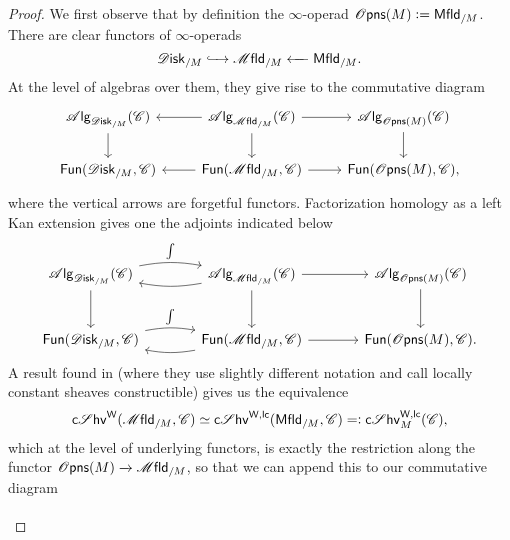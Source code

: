 \documentclass[../text]{subfiles}
\begin{document}
\begin{proof}
    We first observe that by definition the $\infty$-operad $\opens(M) := \mfld[r]_{/M}$. There are clear functors of $\infty$-operads
    \begin{equation}
        \disk_{/M} \xhookrightarrow{\ \ \ } \mfld_{/M} \xleftarrow{\ \ \ } \mfld[r]_{/M}.
    \end{equation}
    At the level of algebras over them, they give rise to the commutative diagram
    \begin{equation}
        \begin{tikzcd}
            \alg{\disk_{/M}} (\catC) \arrow[d] & \alg{\mfld_{/M}} (\catC) \arrow[l] \arrow[r] \arrow[d] & \alg{\opens(M)} (\catC) \arrow[d] \\
            \mathsf{Fun}(\disk_{/M}, \catC) & \mathsf{Fun}(\mfld_{/M}, \catC) \arrow[l] \arrow[r] & \mathsf{Fun}(\opens(M), \catC),
        \end{tikzcd}
    \end{equation}
    where the vertical arrows are forgetful functors. Factorization homology as a left Kan extension gives one the adjoints indicated below
    \begin{equation}
        \begin{tikzcd}[row sep = large, column sep = large]
            \alg{\disk_{/M}} (\catC) \arrow[r, bend left=10, "\int"] \arrow[d] & \alg{\mfld_{/M}} (\catC) \arrow[l, bend left=10] \arrow[r] \arrow[d] & \alg{\opens(M)} (\catC) \arrow[d] \\
            \mathsf{Fun}(\disk_{/M}, \catC) \arrow[r, bend left=10, "\int"] & \mathsf{Fun}(\mfld_{/M}, \catC) \arrow[l, bend left=10] \arrow[r] & \mathsf{Fun}(\opens(M), \catC).
        \end{tikzcd}
    \end{equation}
    A result found in \cite[thm.1.2.5]{aft_localstrut} (where they use slightly different notation and call locally constant sheaves constructible) gives us the equivalence
    \begin{equation}
        \csheaves[W](\mfld_{/M}, \catC) \simeq \csheaves[W, lc](\mfld[r]_{/M}, \catC) =: \csheaves[W, lc]_M(\catC),
    \end{equation}
    which at the level of underlying functors, is exactly the restriction along the functor $\opens(M) \xrightarrow{} \mfld_{/M}$, so that we can append this to our commutative diagram
    \begin{equation}
        \begin{tikzcd}[row sep = large, column sep = large]

\end{tikzcd}
\end{equation}
\end{proof}
\end{document}
